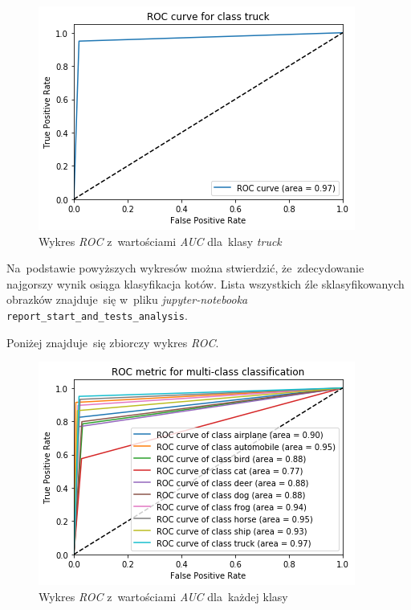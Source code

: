 \documentclass[11pt, a4paper]{article}
\begin{document}
\begin{figure}[H]
\centering
    \includegraphics[scale=0.8]{roc_9.png}
    \caption{Wykres \textit{ROC} z~wartościami \textit{AUC} dla~klasy \textit{truck}}
\end{figure}

Na~podstawie powyższych wykresów można stwierdzić, że~zdecydowanie najgorszy wynik osiąga klasyfikacja kotów.
Lista wszystkich źle sklasyfikowanych obrazków znajduje~się w~pliku \textit{jupyter-notebooka} \texttt{report\_start\_and\_tests\_analysis}.

Poniżej znajduje~się zbiorczy wykres \textit{ROC}.
\begin{figure}[H]
\centering
    \includegraphics[scale=0.8]{roc.png}
    \caption{Wykres \textit{ROC} z~wartościami \textit{AUC} dla~każdej klasy}
\end{figure}
\end{document}
